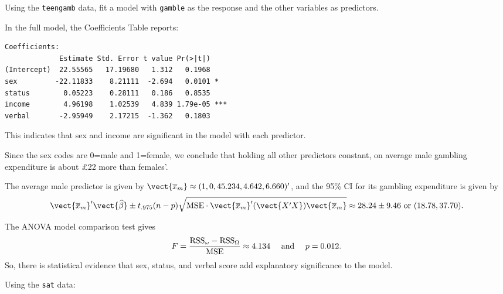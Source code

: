 \documentclass{homework}
\begin{document}
Using the \texttt{teengamb} data, fit a model with \texttt{gamble} as the response and the other variables as predictors.  


In the full model, the Coefficients Table reports:
{\small\begin{verbatim}
Coefficients:
             Estimate Std. Error t value Pr(>|t|)    
(Intercept)  22.55565   17.19680   1.312   0.1968    
sex         -22.11833    8.21111  -2.694   0.0101 *  
status        0.05223    0.28111   0.186   0.8535    
income        4.96198    1.02539   4.839 1.79e-05 ***
verbal       -2.95949    2.17215  -1.362   0.1803    
\end{verbatim}}
This indicates that sex and income are significant in the model with each predictor.


Since the sex codes are 0=male and 1=female, we conclude that holding all other predictors constant, on average male gambling expenditure is about \pounds22 more than females'.


The average male predictor is given by $\vect{\bar x_{m}} \approx ( 1,0, 45.234 , 4.642 , 6.660 )'$, and the 95\% CI for its gambling expenditure is given by
$$
 \vect{\bar x_{m}}'\vect{\hat \beta} \pm t_{.975}(n-p)\sqrt{\MSE\cdot\vect {\bar x_m}'(\vect{X'X})\vect {\bar x_m}}\approx 28.24\pm9.46\text{ or }(18.78,37.70).
$$


The ANOVA model comparison test gives
$$
  F = \frac{\mathrm{RSS}_\omega - \mathrm{RSS}_\Omega}{\mathrm{MSE}} \approx 4.134\quad\text{ and }\quad p = 0.012.
$$
So, there is statistical evidence that sex, status, and verbal score add explanatory significance to the model.

Using the \texttt{sat} data:

\end{document}
